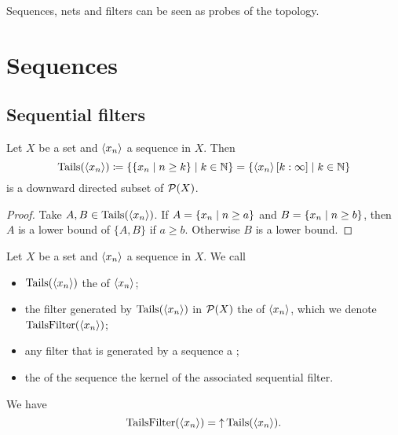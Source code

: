 Sequences, nets and filters can be seen as probes of the topology.
\section{Sequences}
\subsection{Sequential filters}

\begin{lemma}
Let $X$ be a set and $\left\langle x_n \right\rangle$ a sequence in $X$. Then
\[ \operatorname{Tails}(\left\langle x_n \right\rangle) \coloneqq \left\{ \left\{ x_n \;\middle|\; n \geq k \right\} \;\middle|\; k\in \mathbb{N} \right\} = \left\{ \left\langle x_n \right\rangle[k:\infty] \;\middle|\; k\in \mathbb{N} \right\} \]
is a downward directed subset of $\operatorname{\mathcal{P}}(X)$.
\end{lemma}
\begin{proof}
Take $A,B\in \operatorname{Tails}(\left\langle x_n \right\rangle)$. If $A = \left\{ x_n \;\middle|\; n \geq a \right\}$ and $B = \left\{ x_n \;\middle|\; n \geq b \right\}$, then $A$ is a lower bound of $\{A,B\}$ if $a\geq b$. Otherwise $B$ is a lower bound.
\end{proof}

\begin{definition}
Let $X$ be a set and $\left\langle x_n \right\rangle$ a sequence in $X$. We call
\begin{itemize}
\item $\operatorname{Tails}(\left\langle x_n \right\rangle)$ the  of $\left\langle x_n \right\rangle$;
\item the filter generated by $\operatorname{Tails}(\left\langle x_n \right\rangle)$ in $\operatorname{\mathcal{P}}(X)$ the  of $\left\langle x_n \right\rangle$, which we denote $\operatorname{TailsFilter}(\left\langle x_n \right\rangle)$;
\item any filter that is generated by a sequence a ;
\item the  of the sequence the kernel of the associated sequential filter.
\end{itemize}
We have 
\[ \operatorname{TailsFilter}(\left\langle x_n \right\rangle) = \operatorname{\uparrow} \operatorname{Tails}(\left\langle x_n \right\rangle). \]
\end{definition}

